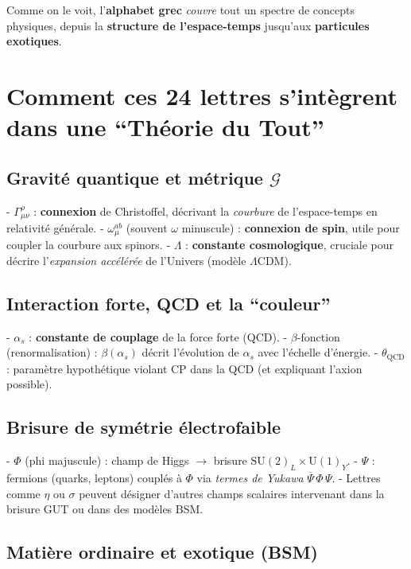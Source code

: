 \documentclass[12pt]{article}
\begin{document}
Comme on le voit, l'\textbf{alphabet grec} \emph{couvre} tout un spectre de concepts 
physiques, depuis la \textbf{structure de l'espace-temps} jusqu'aux \textbf{particules exotiques}.

\section{Comment ces 24 lettres s'intègrent dans une “Théorie du Tout”}

\subsection{Gravité quantique et métrique \(\mathcal{G}\)}

- \(\Gamma^\rho_{\mu\nu}\) : \textbf{connexion} de Christoffel, décrivant la \emph{courbure} 
  de l'espace-temps en relativité générale.
- \(\omega_\mu^{ab}\) (souvent \(\omega\) minuscule) : \textbf{connexion de spin}, 
  utile pour coupler la courbure aux spinors.
- \(\Lambda\) : \textbf{constante cosmologique}, cruciale pour décrire l'\emph{expansion accélérée} 
  de l'Univers (modèle \(\Lambda\mathrm{CDM}\)).

\subsection{Interaction forte, QCD et la “couleur”}

- \(\alpha_s\) : \textbf{constante de couplage} de la force forte (QCD). 
- \(\beta\)-fonction (renormalisation) : \(\beta(\alpha_s)\) décrit l'évolution 
  de \(\alpha_s\) avec l'échelle d'énergie.
- \(\theta_{\mathrm{QCD}}\) : paramètre hypothétique violant CP dans la QCD 
  (et expliquant l'axion possible).

\subsection{Brisure de symétrie électrofaible}

- \(\Phi\) (phi majuscule) : champ de Higgs \(\rightarrow\) brisure \(\mathrm{SU}(2)_L\times\mathrm{U}(1)_Y\).  
- \(\Psi\) : fermions (quarks, leptons) couplés à \(\Phi\) via \emph{termes de Yukawa} 
  \(\overline{\Psi}\,\Phi\,\Psi\).
- Lettres comme \(\eta\) ou \(\sigma\) peuvent désigner d'autres champs scalaires 
  intervenant dans la brisure GUT ou dans des modèles BSM.

\subsection{Matière ordinaire et exotique (BSM)}
\end{document}
